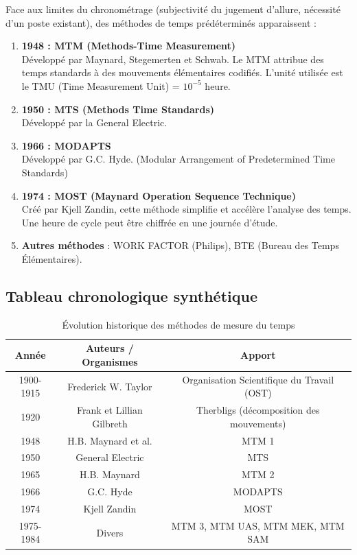 \documentclass[a4paper,12pt]{article}
\begin{document}
Face aux limites du chronométrage (subjectivité du jugement d'allure, nécessité d'un poste existant), des méthodes de temps prédéterminés apparaissent :

\begin{enumerate}
    \item \textbf{1948 : MTM (Methods-Time Measurement)} \\
    Développé par Maynard, Stegemerten et Schwab. Le MTM attribue des temps standards à des mouvements élémentaires codifiés. L'unité utilisée est le TMU (Time Measurement Unit) = $10^{-5}$ heure.
    
    \item \textbf{1950 : MTS (Methods Time Standards)} \\
    Développé par la General Electric.
    
    \item \textbf{1966 : MODAPTS} \\
    Développé par G.C. Hyde. (Modular Arrangement of Predetermined Time Standards)
    
    \item \textbf{1974 : MOST (Maynard Operation Sequence Technique)} \\
    Créé par Kjell Zandin, cette méthode simplifie et accélère l'analyse des temps. Une heure de cycle peut être chiffrée en une journée d'étude.
    
    \item \textbf{Autres méthodes} : WORK FACTOR (Philips), BTE (Bureau des Temps Élémentaires).
\end{enumerate}

\subsection{Tableau chronologique synthétique}

\begin{table}[ht]
\centering
\begin{tabular}{|c|c|c|}
\hline
\textbf{Année} & \textbf{Auteurs / Organismes} & \textbf{Apport} \\
\hline
1900-1915 & Frederick W. Taylor & Organisation Scientifique du Travail (OST) \\
1920 & Frank et Lillian Gilbreth & Therbligs (décomposition des mouvements) \\
1948 & H.B. Maynard et al. & MTM 1 \\
1950 & General Electric & MTS \\
1965 & H.B. Maynard & MTM 2 \\
1966 & G.C. Hyde & MODAPTS \\
1974 & Kjell Zandin & MOST \\
1975-1984 & Divers & MTM 3, MTM UAS, MTM MEK, MTM SAM \\
\hline
\end{tabular}
\caption{Évolution historique des méthodes de mesure du temps}
\end{table}
\end{document}
